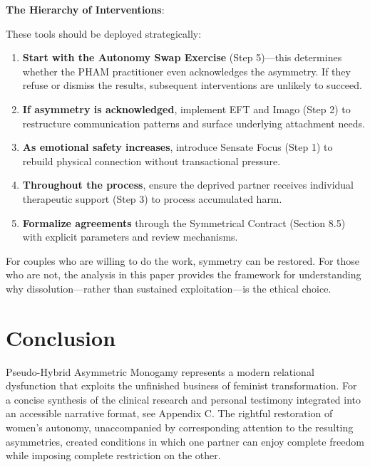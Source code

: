 \documentclass[12pt, letterpaper]{article}
\begin{document}
\textbf{The Hierarchy of Interventions}:

These tools should be deployed strategically:

\begin{enumerate}
    \item \textbf{Start with the Autonomy Swap Exercise} (Step 5)---this determines whether the PHAM practitioner even acknowledges the asymmetry. If they refuse or dismiss the results, subsequent interventions are unlikely to succeed.
    
    \item \textbf{If asymmetry is acknowledged}, implement EFT and Imago (Step 2) to restructure communication patterns and surface underlying attachment needs.
    
    \item \textbf{As emotional safety increases}, introduce Sensate Focus (Step 1) to rebuild physical connection without transactional pressure.
    
    \item \textbf{Throughout the process}, ensure the deprived partner receives individual therapeutic support (Step 3) to process accumulated harm.
    
    \item \textbf{Formalize agreements} through the Symmetrical Contract (Section 8.5) with explicit parameters and review mechanisms.
\end{enumerate}

For couples who are willing to do the work, symmetry can be restored. For those who are not, the analysis in this paper provides the framework for understanding why dissolution---rather than sustained exploitation---is the ethical choice.

\section{Conclusion}

Pseudo-Hybrid Asymmetric Monogamy represents a modern relational dysfunction that exploits the unfinished business of feminist transformation. For a concise synthesis of the clinical research and personal testimony integrated into an accessible narrative format, see Appendix C. The rightful restoration of women's autonomy, unaccompanied by corresponding attention to the resulting asymmetries, created conditions in which one partner can enjoy complete freedom while imposing complete restriction on the other.
\end{document}
